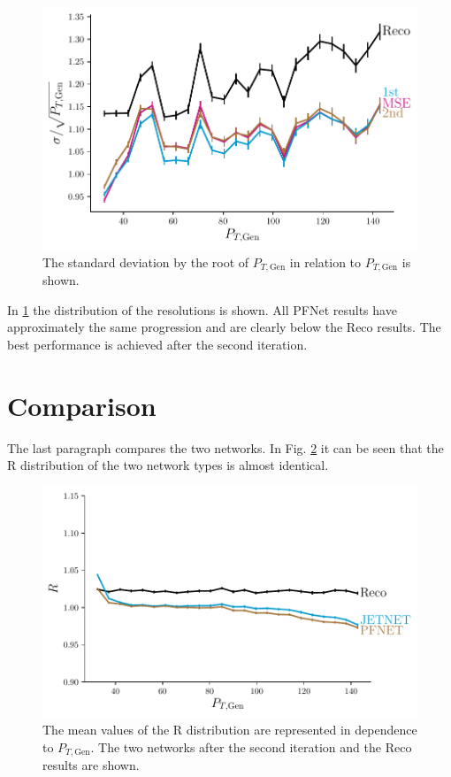 \documentclass[12pt, a4paper]{thesis}
\begin{document}
\begin{figure}[H]
  \centering
  \includegraphics[width=.9\linewidth]{../images/pfnet_res.pdf}
  \caption{The standard deviation by the root of \(P_{T, \text{Gen}}\)
    in relation to \(P_{T, \text{Gen}}\) is shown.}
  \label{pfnet_res}
\end{figure} 

In \ref{pfnet_res} the distribution of the resolutions is shown. All
PFNet results have approximately the same progression and are clearly
below the Reco results. The best performance is achieved after the
second iteration.

\section{Comparison}
\label{sec:org638f190}

The last paragraph compares the two networks. In Fig. \ref{comp_R} it
can be seen that the R distribution of the two network types is almost
identical.

\begin{figure}[H]
  \centering
  \includegraphics[width=.9\linewidth]{../images/comp_R.pdf}
  \caption{The mean values of the R distribution are represented in
    dependence to \(P_{T, \text{Gen}}\). The two networks after the
    second iteration and the Reco results are shown.}
  \label{comp_R}
\end{figure}
\end{document}
